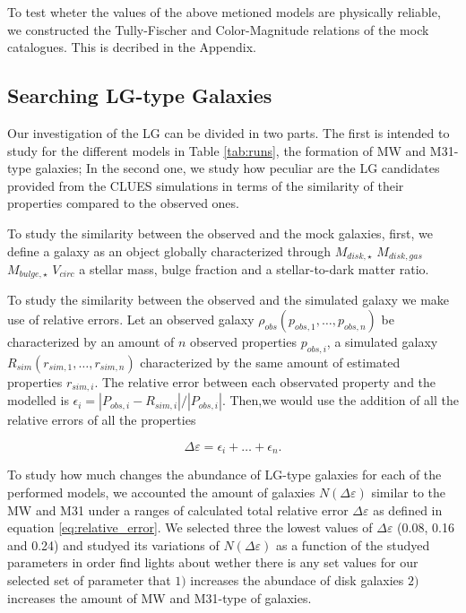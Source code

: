 \documentclass[usenatbib]{mn2e}
\begin{document}
To test wheter the values of the above metioned models are physically
reliable, we constructed the Tully-Fischer and Color-Magnitude
relations of the mock catalogues. This is decribed in the Appendix. 




\subsection{Searching LG-type Galaxies}
\label{sec:method:finding-lg}
Our investigation of the LG can be divided in two parts. The first is
intended to study  for the  different models in Table \ref{tab:runs},
the formation of MW  and M31-type galaxies; In the second one, we
study how peculiar are the LG candidates provided from the CLUES
simulations in terms of the similarity of their properties compared to
the observed ones. 


To study the similarity between the observed and the mock galaxies,
first, we define a galaxy as an object globally characterized through
$M_{disk,\star}$   $M_{disk,gas}$    $M_{bulge,\star}$    $V_{circ}$ a
stellar mass, bulge fraction  and a stellar-to-dark matter ratio. 

To study the similarity between the observed and the simulated galaxy
we make use of relative errors. Let an observed galaxy
$\rho_{obs}(p_{obs,1}, \dots ,p_{obs,n})$ be characterized by an
amount of $n$ observed properties $p_{obs,i}$, a simulated galaxy
$R_{sim}(r_{sim,1}, \dots,r_{sim,n})$ characterized by the same amount
of  estimated properties $r_{sim,i}$. The relative error between each
observated property and the modelled is
$\epsilon_i=|P_{obs,i}-R_{sim,i}|/|P_{obs,i}|$. Then,we would use the
addition of all the relative errors of all the properties 

\begin{equation}
 \Delta \varepsilon = \epsilon_i+\dots+\epsilon_n.\label{eq:relative_error}
\end{equation}

To study how much changes the abundance of LG-type galaxies for each
of the performed models, we accounted the amount of galaxies $N(\Delta
\varepsilon)$ similar to the MW and M31 under a ranges of calculated
total relative error  $\Delta \varepsilon$ as defined in equation
\ref{eq:relative_error}. We selected  three the lowest values of
$\Delta \varepsilon$ (0.08, 0.16 and 0.24) and studyed its variations
of $N(\Delta \varepsilon)$ as a function of the studyed parameters in
order find lights about wether there is any set values for our
selected set of parameter that $1)$ increases the abundace of disk
galaxies $2)$increases the amount of MW and M31-type of galaxies. 
 
\end{document}
